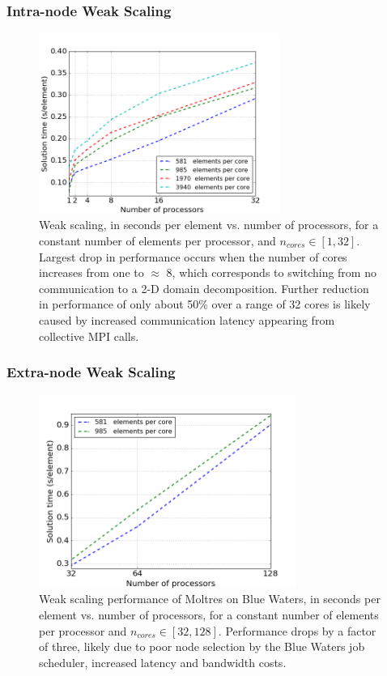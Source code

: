 \begin{frame}
        \frametitle{Intra-node Weak Scaling}
        \vspace*{-0.2in} 
\begin{figure}[htpb]
  \centering
  \includegraphics[width=0.7\textwidth]{./images/intra-node_weak.png}
  \caption{Weak scaling, in seconds per element vs. number of processors, for a constant number of elements
        per processor, and $n_{cores}\in[1,32]$.
        Largest drop in performance occurs when the number of cores increases 
        from one to $\approx$ 8, which corresponds to switching from no 
        communication to a 2-D domain decomposition.  Further reduction in performance of only about 50\% over a range of 32 cores is likely caused by increased communication latency appearing from collective \gls{MPI} calls.  
        }
  \label{fig:intra_weak}
\end{figure}
\end{frame}


\begin{frame}
\frametitle{Extra-node Weak Scaling}
        \vspace*{-0.2in}
\begin{figure}[htpb]
  \centering
  \includegraphics[width=0.75\textwidth]{./images/extra-node_weak.png}
  \caption{Weak scaling performance of Moltres on Blue Waters, in seconds per 
        element vs. number of processors, for a constant number of elements per processor and $n_{cores}\in[32,128]$.
        Performance drops by a factor of three, likely due to poor node 
        selection by the Blue Waters job scheduler, increased latency and bandwidth costs.
        }
  \label{fig:extra_weak}
\end{figure}
\end{frame}

